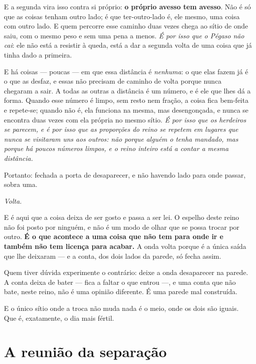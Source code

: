 \documentclass[livro.tex]{subfiles}
\begin{document}
E a segunda vira isso contra si próprio: \textbf{o próprio avesso tem avesso}. Não é só que as
coisas tenham outro lado; é que ter-outro-lado é, ele mesmo, uma coisa com outro lado. E quem
percorre esse caminho duas vezes chega ao sítio de onde saiu, com o mesmo peso e sem uma pena
a menos. \emph{É por isso que o Pégaso não cai}: ele não está a resistir à queda, está a dar a
segunda volta de uma coisa que já tinha dado a primeira.

E há coisas --- poucas --- em que essa distância é \emph{nenhuma}: o que elas fazem já é o que
as desfaz, e essas não precisam de caminho de volta porque nunca chegaram a sair. A todas as
outras a distância é um número, e é ele que lhes dá a forma. Quando esse número é limpo, sem
resto nem fração, a coisa fica bem-feita e repete-se; quando não é, ela funciona na mesma, mas
desengonçada, e nunca se encontra duas vezes com ela própria no mesmo sítio. \emph{É por isso
que os herdeiros se parecem, e é por isso que as proporções do reino se repetem em lugares que
nunca se visitaram uns aos outros: não porque alguém o tenha mandado, mas porque há poucos
números limpos, e o reino inteiro está a contar a mesma distância.}

Portanto: fechada a porta de desaparecer, e não havendo lado para onde passar, sobra uma.

\begin{center}\itshape
Volta.
\end{center}

\medskip

E é aqui que a coisa deixa de ser gosto e passa a ser lei. O espelho deste reino não foi
posto por ninguém, e não é um modo de olhar que se possa trocar por outro. \textbf{É o que
acontece a uma coisa que não tem para onde ir e também não tem licença para acabar.} A onda
volta porque é a única saída que lhe deixaram --- e a conta, dos dois lados da parede, só
fecha assim.

Quem tiver dúvida experimente o contrário: deixe a onda desaparecer na parede. A conta deixa
de bater --- fica a faltar o que entrou ---, e uma conta que não bate, neste reino, não é
uma opinião diferente. É uma parede mal construída.

E o único sítio onde a troca não muda nada é o meio, onde os dois são iguais. Que é,
exatamente, o dia mais fértil.

\section{A reunião da separação}
\end{document}
